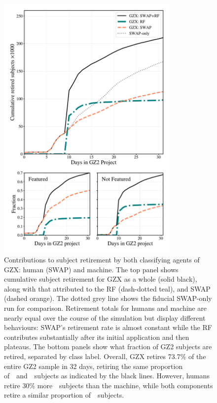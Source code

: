\begin{figure}
\centering
\includegraphics[width=3.5in]{Figures/human_machine/GZX_component_contributions.pdf}
\caption[Individual contributions of human and machine to galaxy classification]{Contributions to subject retirement by both classifying agents of GZX: human (SWAP) and machine. The top panel shows cumulative subject retirement for GZX as a whole (solid black), along with that attributed to the RF (dash-dotted teal), and SWAP (dashed orange). The dotted grey line shows the fiducial SWAP-only run for comparison. Retirement totals for humans and machine are nearly equal over the course of the simulation but display different behaviours: SWAP's retirement rate is almost constant while the RF contributes substantially after its initial application and then plateaus.  The bottom panels show what fraction of GZ2 subjects are retired, separated by class label. Overall, GZX retires 73.7\% of the entire GZ2 sample in 32 days, retiring the same proportion of~\feat~and~\notfeat~subjects as indicated by the black lines. However, humans retire 30\% more~\feat~subjects than the machine, while both components retire a similar proportion of~\notfeat~subjects. \label{fig: gzx components}}
\end{figure}

